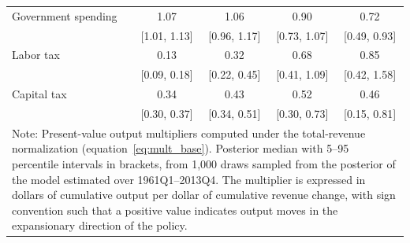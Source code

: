 \begin{table}[ht]
\begin{tabular}{lcccc}
Government spending & 1.07 & 1.06 & 0.90 & 0.72 \\
                    & [1.01, 1.13] & [0.96, 1.17] & [0.73, 1.07] & [0.49, 0.93] \\
Labor tax           & 0.13 & 0.32 & 0.68 & 0.85 \\
                    & [0.09, 0.18] & [0.22, 0.45] & [0.41, 1.09] & [0.42, 1.58] \\
Capital tax         & 0.34 & 0.43 & 0.52 & 0.46 \\
                    & [0.30, 0.37] & [0.34, 0.51] & [0.30, 0.73] & [0.15, 0.81] \\
\hline\hline
\multicolumn{5}{p{0.85\textwidth}}{\footnotesize Note: Present-value output multipliers computed under the total-revenue normalization (equation~\ref{eq:mult_base}). Posterior median with 5--95 percentile intervals in brackets, from 1,000 draws sampled from the posterior of the model estimated over 1961Q1--2013Q4. The multiplier is expressed in dollars of cumulative output per dollar of cumulative revenue change, with sign convention such that a positive value indicates output moves in the expansionary direction of the policy.}
\end{tabular}
\end{table}
